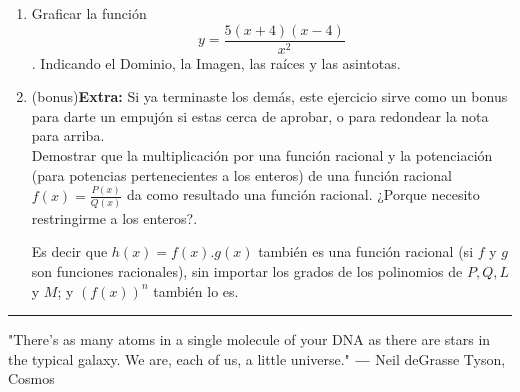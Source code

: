 \documentclass[a4paper,spanish]{exam}
\begin{document}
\begin{enumerate}
\item  Graficar la función \[ y=\frac{5(x+4)(x-4)}{x^2}  \]. Indicando el Dominio, la Imagen, las raíces y las asintotas.

 \item (bonus)\textbf{Extra:}
 Si ya terminaste los demás, este ejercicio sirve como un bonus para darte un empujón si estas cerca de aprobar, o para redondear la nota para arriba.\\
 
Demostrar que la multiplicación por una función racional y la potenciación (para potencias pertenecientes a los enteros) de una función racional $f(x)=\frac{P(x)}{Q(x)}$ da como resultado una función racional. ¿Porque necesito restringirme a los enteros?.

Es decir que $h(x)=f(x).g(x)$ también es una función racional (si $f$ y $g$ son funciones racionales), sin importar los grados de los polinomios de $P,Q,L$ y $M$; y $(f(x))^{n}$ también lo es. 

\end{enumerate}
 
\rule[2ex]{\textwidth}{2pt}
 
"There’s as many atoms in a single molecule of your DNA as there are stars in the typical galaxy. We are, each of us, a little universe."
$―$ Neil deGrasse Tyson, Cosmos 






\end{document}
